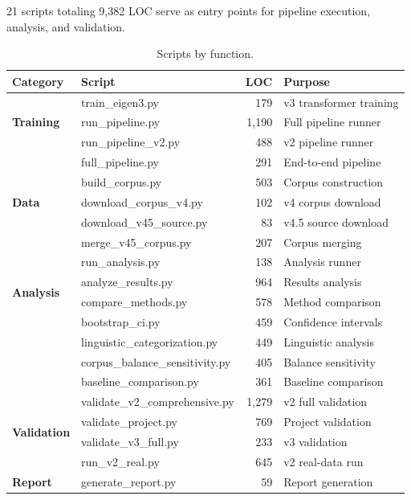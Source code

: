 \documentclass[11pt,a4paper]{article}
\begin{document}
21 scripts totaling 9{,}382 LOC serve as entry points for pipeline execution,
analysis, and validation.

\begin{table}[H]
\centering
\caption{Scripts by function.}
\small
\begin{tabular}{@{}llrl@{}}
\toprule
\textbf{Category} & \textbf{Script} & \textbf{LOC} & \textbf{Purpose} \\
\midrule
\multirow{3}{*}{\textbf{Training}} & train\_eigen3.py & 179 & v3 transformer training \\
 & run\_pipeline.py & 1{,}190 & Full pipeline runner \\
 & run\_pipeline\_v2.py & 488 & v2 pipeline runner \\
 & full\_pipeline.py & 291 & End-to-end pipeline \\
\midrule
\multirow{3}{*}{\textbf{Data}} & build\_corpus.py & 503 & Corpus construction \\
 & download\_corpus\_v4.py & 102 & v4 corpus download \\
 & download\_v45\_source.py & 83 & v4.5 source download \\
 & merge\_v45\_corpus.py & 207 & Corpus merging \\
\midrule
\multirow{4}{*}{\textbf{Analysis}} & run\_analysis.py & 138 & Analysis runner \\
 & analyze\_results.py & 964 & Results analysis \\
 & compare\_methods.py & 578 & Method comparison \\
 & bootstrap\_ci.py & 459 & Confidence intervals \\
 & linguistic\_categorization.py & 449 & Linguistic analysis \\
 & corpus\_balance\_sensitivity.py & 405 & Balance sensitivity \\
 & baseline\_comparison.py & 361 & Baseline comparison \\
\midrule
\multirow{4}{*}{\textbf{Validation}} & validate\_v2\_comprehensive.py & 1{,}279 & v2 full validation \\
 & validate\_project.py & 769 & Project validation \\
 & validate\_v3\_full.py & 233 & v3 validation \\
 & run\_v2\_real.py & 645 & v2 real-data run \\
\midrule
\textbf{Report} & generate\_report.py & 59 & Report generation \\
\bottomrule
\end{tabular}
\end{table}
\end{document}
